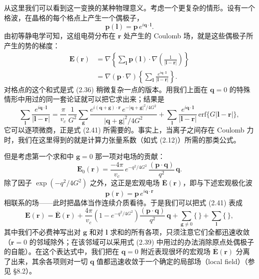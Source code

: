 从这里我们可以看到这一变换的某种物理意义。考虑一个更复杂的情形。设有一个格波，在晶格的每个格点上产生一个偶极子，
\begin{equation*}
\mathbf{p}(\boldsymbol{l}) = \mathbf{p}\, e^{i\mathbf{q}\cdot\boldsymbol{l}}.
\tag{2.40}
\end{equation*}
由初等静电学可知，这组电荷分布在 $\mathbf{r}$ 处产生的 Coulomb 场，就是这些偶极子所产生的势的梯度：
\begin{align*}
\mathbf{E}(\mathbf{r}) &= \nabla\left\{\sum_{\boldsymbol{l}} \mathbf{p}(\boldsymbol{l})\cdot\nabla\left(\frac{1}{|\boldsymbol{l}-\mathbf{r}|}\right)\right\} \\
&= \nabla(\mathbf{p}\cdot\nabla)\left\{\sum_{\boldsymbol{l}} \frac{e^{i\mathbf{q}\cdot\boldsymbol{l}}}{|\boldsymbol{l}-\mathbf{r}|}\right\}.
\tag{2.41}
\end{align*}
对格点的这个和式是式 (2.36) 稍微复杂一点的版本。用我们上面在 $\mathbf{q}=0$ 的特殊情形中用过的同一套论证就可以把它求出来；结果是
\begin{equation*}
\sum_{\boldsymbol{l}} \frac{e^{i\mathbf{q}\cdot\boldsymbol{l}}}{|\boldsymbol{l}-\mathbf{r}|} = \frac{\pi}{v_c}\,\frac{1}{G^2}\sum_{\boldsymbol{g}} \frac{e^{i(\mathbf{q}+\boldsymbol{g})\cdot\mathbf{r}}\, e^{-|\mathbf{q}+\boldsymbol{g}|^2/4G^2}}{|\mathbf{q}+\boldsymbol{g}|^2/4G^2} + \sum_{\boldsymbol{l}} \frac{e^{i\mathbf{q}\cdot\boldsymbol{l}}}{|\boldsymbol{l}-\mathbf{r}|}\,\mathrm{erf}\{G|\boldsymbol{l}-\mathbf{r}|\},
\tag{2.42}
\end{equation*}
它可以逐项微商，正是式 (2.41) 所需要的。事实上，当离子之间存在 Coulomb 力时，我们在这里得到的就是计算力张量系数（如式 (2.12)）所需的那类公式。

但是考虑第一个求和中 $\boldsymbol{g}=0$ 那一项对电场的贡献：
\begin{equation*}
\mathbf{E}_0(\mathbf{r}) = \frac{-4\pi}{v_c}\, e^{-q^2/4G^2}\,\frac{(\mathbf{p}\cdot\mathbf{q})}{q^2}\,\mathbf{q}.
\tag{2.43}
\end{equation*}
除了因子 $\exp(-q^2/4G^2)$ 之外，这正是宏观电场 $\overline{\mathbf{E}}(\mathbf{r})$，即与下述宏观极化波
\begin{equation*}
\mathbf{p}(\mathbf{r}) = \mathbf{p}\, e^{i\mathbf{q}\cdot\mathbf{r}}
\tag{2.44}
\end{equation*}
相联系的场——此时把晶体当作连续介质看待。于是我们可以把式 (2.41) 表成
\begin{equation*}
\mathbf{E}(\mathbf{r}) = \overline{\mathbf{E}}(\mathbf{r}) + \frac{4\pi}{v_c}\left(1-e^{-q^2/4G^2}\right)\frac{(\mathbf{p}\cdot\mathbf{q})}{q^2}\,\mathbf{q} + \sum_{\boldsymbol{g}\neq 0}\{\,\} + \sum_{\boldsymbol{l}}\{\,\},
\tag{2.45}
\end{equation*}
其中我们不必费神写出对 $\boldsymbol{g}$ 和对 $\boldsymbol{l}$ 求和的所有各项，只须注意它们全都迅速收敛（$\mathbf{r}=0$ 的邻域除外；在该邻域可以采用式 (2.39) 中用过的办法消除原点处偶极子的自能）。在这个表达式中，我们把在 $\mathbf{q}=0$ 附近表现很坏的宏观场 $\overline{\mathbf{E}}(\mathbf{r})$ 分离了出来，其余各项则对一切 $\mathbf{q}$ 值都迅速收敛于一个确定的局部场（local field）（参见 §8.2）。


